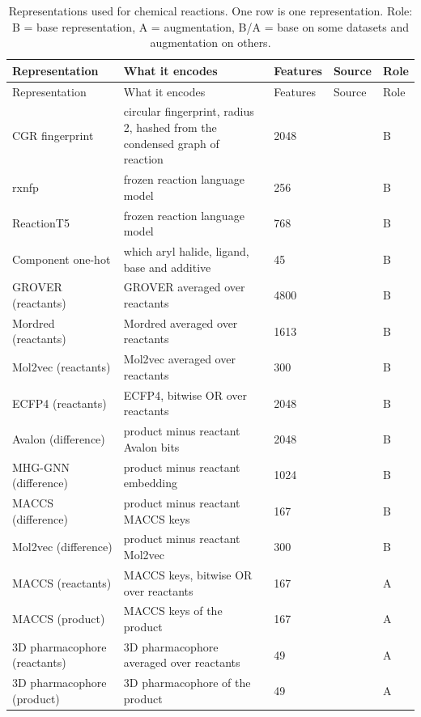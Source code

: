 \begin{longtable}{p{3.2cm}p{5.6cm}p{1.6cm}p{1.6cm}p{1.4cm}}
\caption{Representations used for chemical reactions. One row is one representation. Role: B = base representation, A = augmentation, B/A = base on some datasets and augmentation on others.}\label{tab:reps_reactions}\\
\toprule
Representation & What it encodes & Features & Source & Role \\
\midrule
\endfirsthead
\toprule
Representation & What it encodes & Features & Source & Role \\
\midrule
\endhead
\bottomrule
\endfoot
CGR fingerprint & circular fingerprint, radius 2, hashed from the condensed graph of reaction & 2048 & \citep{Hoonakker2011} & B \\
rxnfp & frozen reaction language model & 256 & \citep{Schwaller2021rxnfp} & B \\
ReactionT5 & frozen reaction language model & 768 & \citep{Sagawa2023ReactionT5} & B \\
Component one-hot & which aryl halide, ligand, base and additive & 45 & \citep{Ahneman2018} & B \\
GROVER (reactants) & GROVER averaged over reactants & 4800 & \citep{Rong2020GROVER} & B \\
Mordred (reactants) & Mordred averaged over reactants & 1613 & \citep{Moriwaki2018} & B \\
Mol2vec (reactants) & Mol2vec averaged over reactants & 300 & \citep{Jaeger2018} & B \\
ECFP4 (reactants) & ECFP4, bitwise OR over reactants & 2048 & \citep{rogers2010} & B \\
Avalon (difference) & product minus reactant Avalon bits & 2048 & \citep{Gedeck2006} & B \\
MHG-GNN (difference) & product minus reactant embedding & 1024 & \citep{kishimoto2023} & B \\
MACCS (difference) & product minus reactant MACCS keys & 167 & \citep{Durant2002} & B \\
Mol2vec (difference) & product minus reactant Mol2vec & 300 & \citep{Jaeger2018} & B \\
MACCS (reactants) & MACCS keys, bitwise OR over reactants & 167 & \citep{Durant2002} & A \\
MACCS (product) & MACCS keys of the product & 167 & \citep{Durant2002} & A \\
3D pharmacophore (reactants) & 3D pharmacophore averaged over reactants & 49 & \citep{rdkit} & A \\
3D pharmacophore (product) & 3D pharmacophore of the product & 49 & \citep{rdkit} & A \\
\end{longtable}

